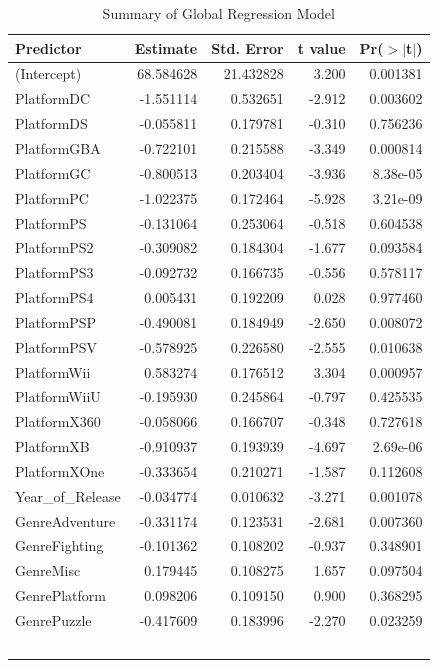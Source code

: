 \documentclass[12pt]{article}
\begin{document}
\begin{table}[ht]
  \caption{Summary of Global Regression Model}
  \label{tab:global}
\centering
\begin{tabular}{lrrrr}
\hline
Predictor & Estimate & Std. Error & t value & Pr($>$$|$t$|$) \\ 
\hline
(Intercept) & 68.584628  & 21.432828  & 3.200 & 0.001381 \\
PlatformDC & -1.551114  & 0.532651  & -2.912 & 0.003602 \\
PlatformDS & -0.055811  & 0.179781  & -0.310 & 0.756236 \\
PlatformGBA & -0.722101  & 0.215588  & -3.349 & 0.000814 \\
PlatformGC & -0.800513  & 0.203404  & -3.936 & 8.38e-05 \\
PlatformPC & -1.022375  & 0.172464  & -5.928 & 3.21e-09 \\
PlatformPS & -0.131064  & 0.253064  & -0.518 & 0.604538 \\
PlatformPS2 & -0.309082  & 0.184304  & -1.677 & 0.093584 \\
PlatformPS3 & -0.092732  & 0.166735  & -0.556 & 0.578117 \\
PlatformPS4 & 0.005431  & 0.192209  & 0.028 & 0.977460 \\
PlatformPSP & -0.490081  & 0.184949  & -2.650 & 0.008072 \\
PlatformPSV & -0.578925  & 0.226580  & -2.555 & 0.010638 \\
PlatformWii & 0.583274  & 0.176512  & 3.304 & 0.000957 \\
PlatformWiiU & -0.195930  & 0.245864  & -0.797 & 0.425535 \\
PlatformX360 & -0.058066  & 0.166707  & -0.348 & 0.727618 \\
PlatformXB & -0.910937  & 0.193939  & -4.697 & 2.69e-06 \\
PlatformXOne & -0.333654  & 0.210271  & -1.587 & 0.112608 \\
Year\_of\_Release & -0.034774  & 0.010632  & -3.271 & 0.001078 \\
GenreAdventure & -0.331174  & 0.123531  & -2.681 & 0.007360 \\
GenreFighting & -0.101362  & 0.108202  & -0.937 & 0.348901 \\
GenreMisc & 0.179445  & 0.108275  & 1.657 & 0.097504 \\
GenrePlatform & 0.098206  & 0.109150  & 0.900 & 0.368295 \\
GenrePuzzle & -0.417609  & 0.183996  & -2.270 & 0.023259 \\
$$
\end{tabular}
\end{table}
\end{document}
